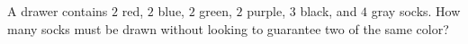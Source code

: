 A drawer contains $2$ red, $2$ blue, $2$ green, $2$ purple, $3$ black, and $4$ gray socks. How many socks must be drawn without looking to guarantee two of the same color?
